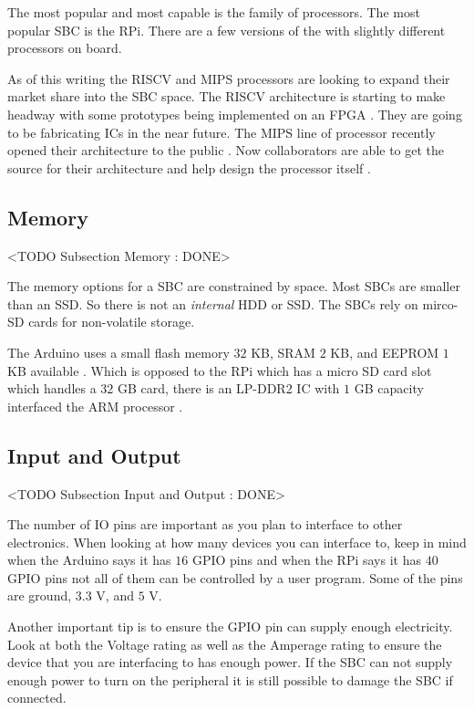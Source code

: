 The most popular and most capable is the  family of processors. The most popular \ac{SBC} is the \ac{RPi}. There are a few versions of the  with slightly different  processors on board.

As of this writing the \ac{RISCV} and \ac{MIPS} processors are looking to expand their market share into the \ac{SBC} space. The \ac{RISCV} architecture is starting to make headway with some prototypes being implemented on an \ac{FPGA} \cite{risvref}. They are going to be fabricating \ac{IC}s in the near future. The \ac{MIPS} line of processor recently opened their architecture to the public \cite{mipsopensrc}. Now collaborators are able to get the source for their architecture and help design the processor itself \cite{mipsref}.
	
\subsection{Memory}
	<TODO Subsection Memory : DONE>

The memory options for a \ac{SBC} are constrained by space. Most \ac{SBC}s are smaller than an \ac{SSD}. So there is not an \emph{internal} \ac{HDD} or \ac{SSD}. The \ac{SBC}s rely on mirco-\ac{SD} cards for non-volatile storage.

The Arduino uses a small flash memory $32$ \ac{KB}, \ac{SRAM} $2$ \ac{KB}, and \ac{EEPROM} $1$ \ac{KB} available \cite{arduspec}. Which is opposed to the \ac{RPi} which has a micro \ac{SD} card slot which handles a $32$ \ac{GB} card, there is an \ac{LP}-\ac{DDR}2 \ac{IC} with $1$ \ac{GB} capacity interfaced the \ac{ARM} processor \cite{rpispec}.
	
\subsection{Input and Output}
	<TODO Subsection Input and Output : DONE>

The number of \ac{IO} pins are important as you plan to interface to other electronics. When looking at how many devices you can interface to, keep in mind when the Arduino says it has $16$ \ac{GPIO} pins and when the \ac{RPi} says it has $40$ \ac{GPIO} pins not all of them can be controlled by a user program. Some of the pins are ground, $3.3$ \ac{V}, and $5$ \ac{V}.

Another important tip is to ensure the \ac{GPIO} pin can supply enough electricity. Look at both the Voltage rating as well as the Amperage rating to ensure the device that you are interfacing to has enough power. If the \ac{SBC} can not supply enough power to turn on the peripheral it is still possible to damage the \ac{SBC} if connected.
	
